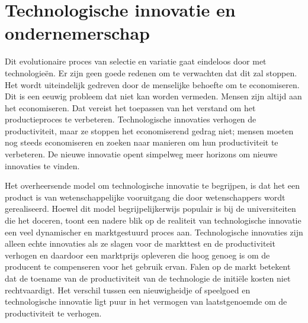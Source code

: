 \hypertarget{technologische-innovatie-en-ondernemerschap}{%
\section{Technologische innovatie en ondernemerschap}\label{technologische-innovatie-en-ondernemerschap}}

Dit evolutionaire proces van selectie en variatie gaat eindeloos door met technologieën. Er zijn geen goede redenen om te verwachten dat dit zal stoppen. Het wordt uiteindelijk gedreven door de menselijke behoefte om te economiseren. Dit is een eeuwig probleem dat niet kan worden vermeden. Mensen zijn altijd aan het economiseren. Dat vereist het toepassen van het verstand om het productieproces te verbeteren. Technologische innovaties verhogen de productiviteit, maar ze stoppen het economiserend gedrag niet; mensen moeten nog steeds economiseren en zoeken naar manieren om hun productiviteit te verbeteren. De nieuwe innovatie opent simpelweg meer horizons om nieuwe innovaties te vinden.

Het overheersende model om technologische innovatie te begrijpen, is dat het een product is van wetenschappelijke vooruitgang die door wetenschappers wordt gerealiseerd. Hoewel dit model begrijpelijkerwijs populair is bij de universiteiten die het doceren, toont een nadere blik op de realiteit van technologische innovatie een veel dynamischer en marktgestuurd proces aan. Technologische innovaties zijn alleen echte innovaties als ze slagen voor de markttest en de productiviteit verhogen en daardoor een marktprijs opleveren die hoog genoeg is om de producent te compenseren voor het gebruik ervan. Falen op de markt betekent dat de toename van de productiviteit van de technologie de initiële kosten niet rechtvaardigt. Het verschil tussen een nieuwigheidje of speelgoed en technologische innovatie ligt puur in het vermogen van laatstgenoemde om de productiviteit te verhogen.


